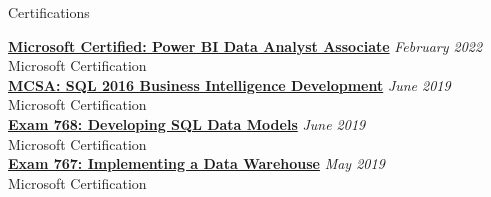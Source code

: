 \documentclass{resume} %
\begin{document}

\begin{rSection}{Certifications}

{\bf \href{https://www.credly.com/badges/021b4b7c-f370-4913-814c-64b6fa5ed9d5}{Microsoft Certified: Power BI Data Analyst Associate}} \hfill {\em February 2022} \\
Microsoft Certification \\

{\bf \href{https://www.youracclaim.com/badges/942bff46-1825-4cf0-8c1a-25221405a6cb}{MCSA: SQL 2016 Business Intelligence Development}} \hfill {\em June 2019} \\
Microsoft Certification \\

{\bf \href{https://www.youracclaim.com/badges/60b5faec-564d-4da6-a8c2-65762a36159e}{Exam 768: Developing SQL Data Models}} \hfill {\em June 2019} \\
Microsoft Certification \\

{\bf \href{https://www.youracclaim.com/badges/7405dcbe-59b0-42a4-804a-77c43f19341d}{Exam 767: Implementing a Data Warehouse}} \hfill {\em May 2019} \\
Microsoft Certification \\

\end{rSection}

\end{document}
